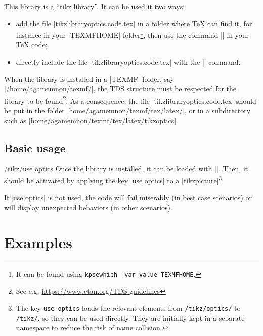 \documentclass[a4paper]{ltxdoc}
\begin{document}
This library is a \enquote{tikz library}. It can be used it two ways:
\begin{itemize}
  \item add the file |tikzlibraryoptics.code.tex| in a folder where \TeX{} can find it, for instance in your |TEXMFHOME| folder\footnote{It can be found using \verb|kpsewhich -var-value TEXMFHOME|. }, then use the command |\usetikzlibrary{optics}| in your \TeX{} code;
  \item directly include the file |tikzlibraryoptics.code.tex| with the || command.
\end{itemize}

When the library is installed in a |TEXMF| folder, say |/home/agamemnon/texmf/|, the TDS structure must be respected for the library to be found\footnote{See e.g. \url{https://www.ctan.org/TDS-guidelines}}. As a consequence, the file |tikzlibraryoptics.code.tex| should be put in the folder |home/agamemnon/texmf/tex/latex/|, or in a subdirectory such as |home/agamemnon/texmf/tex/latex/tikzoptics|.

\subsection{Basic usage}

\begin{key}{/tikz/use optics}
Once the library is installed, it can be loaded with |\usetikzlibrary{optics}|. Then, it should be activated by applying the key |use optics| to a |tikzpicture|\footnote{The key \texttt{use optics} loads the relevant elements from \texttt{/tikz/optics/} to \texttt{/tikz/}, so they can be used directly. They are initially kept in a separate namespace to reduce the risk of name collision.}

\begin{codeexample}[width=5cm]
\end{codeexample}

If |use optics| is not used, the code will fail miserably (in best case scenarios) or will display unexpected behaviors (in other scenarios).
\end{key}

\section{Examples}
\end{document}
